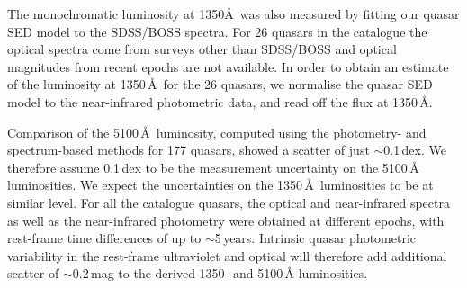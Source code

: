 The monochromatic luminosity at 1350\AA\, was also measured by fitting our quasar SED model to the SDSS/BOSS spectra. 
For 26 quasars in the catalogue the optical spectra come from surveys other than SDSS/BOSS and optical magnitudes from recent epochs are not available. 
In order to obtain an estimate of the luminosity at 1350\,\AA\, for the 26 quasars, we normalise the quasar SED model to the near-infrared photometric data, and read off the flux at 1350\,\AA. 

Comparison of the 5100\,\AA\, luminosity, computed using the photometry- and spectrum-based methods for 177 quasars, showed a scatter of just $\sim$0.1\,dex.
We therefore assume 0.1\,dex to be the measurement uncertainty on the 5100\,\AA\, luminosities.
We expect the uncertainties on the 1350\,\AA\, luminosities to be at similar level.  
For all the catalogue quasars, the optical and near-infrared spectra as well as the near-infrared photometry were obtained at different epochs, with rest-frame time differences of up to $\sim$5\,years. 
Intrinsic quasar photometric variability in the rest-frame ultraviolet and optical will therefore add additional scatter of $\sim$0.2\,mag \citep[e.g.][]{macleod10} to the derived 1350- and 5100\,\AA-luminosities.

